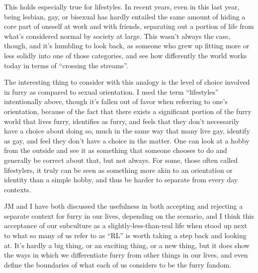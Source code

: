 This holds especially true for lifestyles. In recent years, even in this
last year, being lesbian, gay, or bisexual has hardly entailed the same
amount of hiding a core part of oneself at work and with friends,
separating out a portion of life from what's considered normal by
society at large. This wasn't always the case, though, and it's humbling
to look back, as someone who grew up fitting more or less solidly into
one of those categories, and see how differently the world works today
in terms of ``crossing the streams''.

The interesting thing to consider with this analogy is the level of
choice involved in furry as compared to sexual orientation. I used the
term ``lifestyles'' intentionally above, though it's fallen out of favor
when referring to one's orientation, because of the fact that there
exists a significant portion of the furry world that lives furry,
identifies as furry, and feels that they don't necessarily have a choice
about doing so, much in the same way that many live gay, identify as
gay, and feel they don't have a choice in the matter. One can look at a
hobby from the outside and see it as something that someone chooses to
do and generally be correct about that, but not always. For some, those
often called lifestylers, it truly can be seen as something more akin to
an orientation or identity than a simple hobby, and thus be harder to
separate from every day contexts.

JM and I have both discussed the usefulness in both accepting and
rejecting a separate context for furry in our lives, depending on the
scenario, and I think this acceptance of our subculture as a
slightly-less-than-real life when stood up next to what so many of us
refer to as ``RL'' is worth taking a step back and looking at. It's
hardly a big thing, or an exciting thing, or a new thing, but it does
show the ways in which we differentiate furry from other things in our
lives, and even define the boundaries of what each of us considers to be
the furry fandom.
